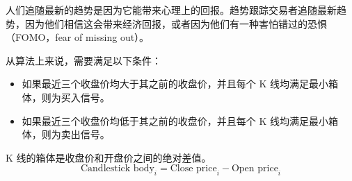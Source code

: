 \begin{tcolorbox}
    人们追随最新的趋势是因为它能带来心理上的回报。趋势跟踪交易者追随最新趋势，因为他们相信这会带来经济回报，或者因为他们有一种害怕错过的恐惧（FOMO，fear of missing out）。
\end{tcolorbox}

从算法上来说，需要满足以下条件：
\begin{itemize}
    \item 如果最近三个收盘价均大于其之前的收盘价，并且每个 K 线均满足最小箱体，则为买入信号。

    \item 如果最近三个收盘价均低于其之前的收盘价，并且每个 K 线均满足最小箱体，则为卖出信号。
\end{itemize}

K 线的箱体是收盘价和开盘价之间的绝对差值。
\begin{equation}
    \text{Candlestick body}_i = \text{Close price}_i - \text{Open price}_i
\end{equation}